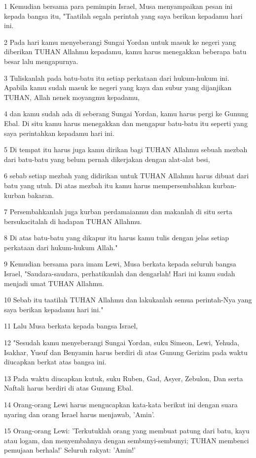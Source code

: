 \par 1 Kemudian bersama para pemimpin Israel, Musa menyampaikan pesan ini kepada bangsa itu, "Taatilah segala perintah yang saya berikan kepadamu hari ini.
\par 2 Pada hari kamu menyeberangi Sungai Yordan untuk masuk ke negeri yang diberikan TUHAN Allahmu kepadamu, kamu harus menegakkan beberapa batu besar lalu mengapurnya.
\par 3 Tuliskanlah pada batu-batu itu setiap perkataan dari hukum-hukum ini. Apabila kamu sudah masuk ke negeri yang kaya dan subur yang dijanjikan TUHAN, Allah nenek moyangmu kepadamu,
\par 4 dan kamu sudah ada di seberang Sungai Yordan, kamu harus pergi ke Gunung Ebal. Di situ kamu harus menegakkan dan mengapur batu-batu itu seperti yang saya perintahkan kepadamu hari ini.
\par 5 Di tempat itu harus juga kamu dirikan bagi TUHAN Allahmu sebuah mezbah dari batu-batu yang belum pernah dikerjakan dengan alat-alat besi,
\par 6 sebab setiap mezbah yang didirikan untuk TUHAN Allahmu harus dibuat dari batu yang utuh. Di atas mezbah itu kamu harus mempersembahkan kurban-kurban bakaran.
\par 7 Persembahkanlah juga kurban perdamaianmu dan makanlah di situ serta bersukacitalah di hadapan TUHAN Allahmu.
\par 8 Di atas batu-batu yang dikapur itu harus kamu tulis dengan jelas setiap perkataan dari hukum-hukum Allah."
\par 9 Kemudian bersama para imam Lewi, Musa berkata kepada seluruh bangsa Israel, "Saudara-saudara, perhatikanlah dan dengarlah! Hari ini kamu sudah menjadi umat TUHAN Allahmu.
\par 10 Sebab itu taatilah TUHAN Allahmu dan lakukanlah semua perintah-Nya yang saya berikan kepadamu hari ini."
\par 11 Lalu Musa berkata kepada bangsa Israel,
\par 12 "Sesudah kamu menyeberangi Sungai Yordan, suku Simeon, Lewi, Yehuda, Isakhar, Yusuf dan Benyamin harus berdiri di atas Gunung Gerizim pada waktu diucapkan berkat atas bangsa ini.
\par 13 Pada waktu diucapkan kutuk, suku Ruben, Gad, Asyer, Zebulon, Dan serta Naftali harus berdiri di atas Gunung Ebal.
\par 14 Orang-orang Lewi harus mengucapkan kata-kata berikut ini dengan suara nyaring dan orang Israel harus menjawab, 'Amin'.
\par 15 Orang-orang Lewi: 'Terkutuklah orang yang membuat patung dari batu, kayu atau logam, dan menyembahnya dengan sembunyi-sembunyi; TUHAN membenci pemujaan berhala!' Seluruh rakyat: 'Amin!'
